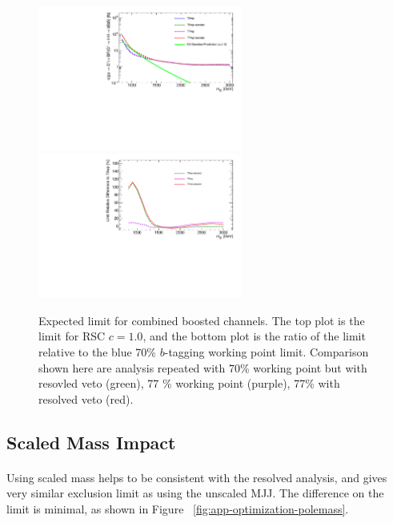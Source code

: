 \begin{figure}[htbp!]
\begin{center}
\includegraphics[angle=270, width=0.6\textwidth]{./figures/boosted/AppendixOptimization/CompareLimits_HH_BoostedNewRun2-resveto_c10.pdf}\\
\includegraphics[angle=270, width=0.6\textwidth]{./figures/boosted/AppendixOptimization/CompareLimits_HH_BoostedNewRun2-resveto_c10_ratio.pdf}
  \caption{Expected limit for combined boosted channels. The top plot is the limit for RSC $c=1.0$, and the bottom plot is the ratio of the limit relative to the blue 70\% $b$-tagging working point limit. Comparison shown here are analysis repeated with 70\% working point but with resovled veto (green), 77 \% working point (purple), 77\% with resolved veto (red).}
  \label{fig:app-optimization-btagging}
\end{center}
\end{figure}


\clearpage
\subsection{Scaled Mass Impact}
\label{sec:app-optimization-polemass}
\paragraph{}
Using scaled mass helps to be consistent with the resolved analysis, and gives very similar exclusion limit as using the unscaled MJJ. The difference on the limit is minimal, as shown in Figure ~\ref{fig:app-optimization-polemass}.

